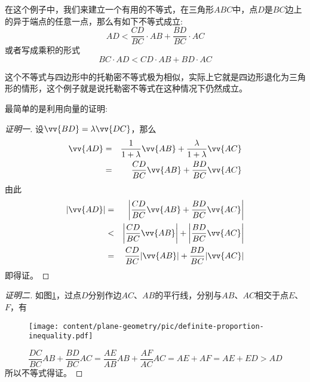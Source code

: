 \begin{example}
  \label{example:ptolemy-inequality-for-triangle}
  在这个例子中，我们来建立一个有用的不等式，在三角形$ABC$中，点$D$是$BC$边上的异于端点的任意一点，那么有如下不等式成立:
  \begin{equation}
    \label{eq:definite-proportion-inequality}
    AD < \frac{CD}{BC} \cdot AB + \frac{BD}{BC} \cdot AC
  \end{equation}
  或者写成乘积的形式
  \begin{equation*}
    BC \cdot AD < CD \cdot AB + BD \cdot AC
  \end{equation*}
  
  这个不等式与四边形中的托勒密不等式极为相似，实际上它就是四边形退化为三角形的情形，这个例子就是说托勒密不等式在这种情况下仍然成立。

  最简单的是利用向量的证明:
  \begin{proof}[证明一]
  设$\vv{BD}=\lambda\vv{DC}$，那么
  \begin{eqnarray*}
    \vv{AD} & = & \frac{1}{1+\lambda}\vv{AB}+\frac{\lambda}{1+\lambda}\vv{AC} \\
   & = & \frac{CD}{BC}\vv{AB}+\frac{BD}{BC}\vv{AC} 
  \end{eqnarray*}
  由此
  \begin{eqnarray*}
    |\vv{AD}| & = & \left| \frac{CD}{BC}\vv{AB}+\frac{BD}{BC}\vv{AC} \right| \\
              & < & \left| \frac{CD}{BC}\vv{AB} \right| + \left| \frac{BD}{BC}\vv{AC} \right| \\
              & = & \frac{CD}{BC} | \vv{AB} | + \frac{BD}{BC} |\vv{AC} |
  \end{eqnarray*}
  即得证。
  \end{proof}
  
  \begin{proof}[证明二]
    如图\ref{fig:definite-proportion-inequality}，过点$D$分别作边$AC$、$AB$的平行线，分别与$AB$、$AC$相交于点$E$、$F$，有

  \begin{figure}[htbp]
  \centering
\texttt{[image: content/plane-geometry/pic/definite-proportion-inequality.pdf]}
\caption{}
\label{fig:definite-proportion-inequality}
\end{figure}

\begin{equation*}
  \frac{DC}{BC}AB + \frac{BD}{BC}AC = \frac{AE}{AB} AB + \frac{AF}{AC} AC = AE + AF = AE + ED > AD
\end{equation*}
所以不等式得证。
  \end{proof}


\end{example}
